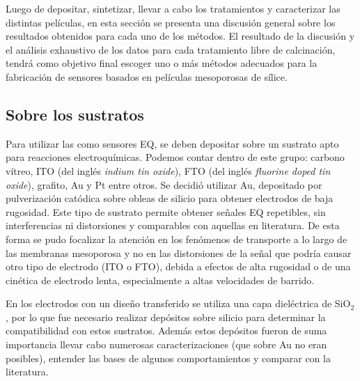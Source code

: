 			Luego de depositar, sintetizar, llevar a cabo los tratamientos y caracterizar las distintas películas, en esta sección se presenta una discusión general sobre los resultados obtenidos para cada uno de los métodos. El resultado de la discusión y el análisis exhaustivo de los datos para cada tratamiento libre de calcinación, tendrá como objetivo final escoger uno o más métodos adecuados para la fabricación de sensores basados en películas mesoporosas de sílice.

	\subsection{Sobre los sustratos}

			Para utilizar las \pdm\space como sensores EQ, se deben depositar sobre un sustrato apto para reacciones electroquímicas. Podemos contar dentro de este grupo: carbono vítreo, ITO (del inglés \textit{indium tin oxide}), FTO (del inglés \textit{fluorine doped tin oxide}), grafito, Au y Pt entre otros. Se decidió utilizar Au, depositado por pulverización catódica sobre obleas de silicio para obtener electrodos de baja rugosidad. Este tipo de sustrato permite obtener señales EQ repetibles, sin interferencias ni distorsiones y comparables con aquellas en literatura.\cite{Wi2000,Bockris1974} De esta forma se pudo focalizar la atención en los fenómenos de transporte a lo largo de las membranas mesoporosa y no en las distorsiones de la señal que podría causar otro tipo de electrodo (ITO o FTO), debida a efectos de alta rugosidad o de una cinética de electrodo lenta, especialmente a altas velocidades de barrido.			
		
		    En los electrodos con un diseño transferido se utiliza una capa dieléctrica de SiO$_2$, por lo que fue necesario realizar depósitos sobre silicio para determinar la compatibilidad con estos sustratos. Además estos depósitos fueron de suma importancia llevar cabo numerosas caracterizaciones (que sobre Au no eran posibles), entender las bases de algunos comportamientos y comparar con la literatura.\cite{Innocenzi2013}

